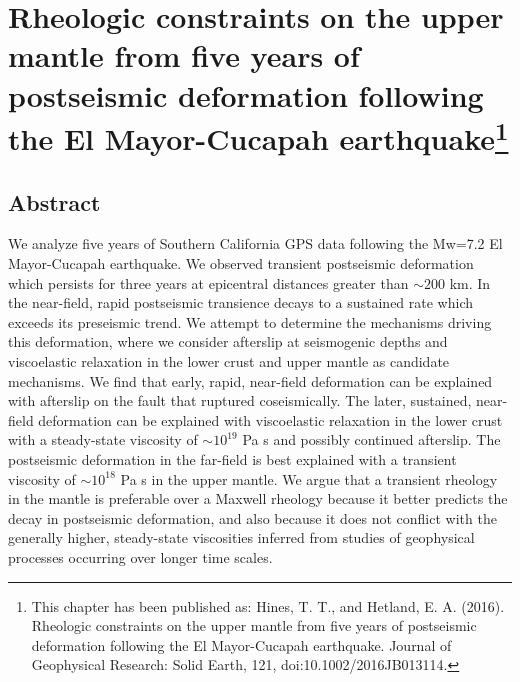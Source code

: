 \chapter
[Rheologic constraints on the upper mantle from five years of
postseismic deformation following the El Mayor-Cucapah earthquake]
{Rheologic constraints on the upper mantle from five years of
postseismic deformation following the El Mayor-Cucapah earthquake\footnote[1]{
This chapter has been published as: Hines, T. T., and Hetland, E. A.
(2016). Rheologic constraints on the upper mantle from five years of
postseismic deformation following the El Mayor-Cucapah earthquake.
Journal of Geophysical Research: Solid Earth, 121,
doi:10.1002/2016JB013114.}}

\section{Abstract}
We analyze five years of Southern California GPS data following the
Mw=7.2 El Mayor-Cucapah earthquake.  We observed transient postseismic
deformation which persists for three years at epicentral distances
greater than ${\sim}200$ km.  In the near-field, rapid postseismic
transience decays to a sustained rate which exceeds its preseismic
trend.  We attempt to determine the mechanisms driving this
deformation, where we consider afterslip at seismogenic depths and
viscoelastic relaxation in the lower crust and upper mantle as
candidate mechanisms.  We find that early, rapid, near-field
deformation can be explained with afterslip on the fault that ruptured
coseismically. The later, sustained, near-field deformation can be
explained with viscoelastic relaxation in the lower crust with a
steady-state viscosity of ${\sim}10^{19}$ Pa s and possibly continued
afterslip.  The postseismic deformation in the far-field is best
explained with a transient viscosity of ${\sim}10^{18}$ Pa s in the
upper mantle. We argue that a transient rheology in the mantle is
preferable over a Maxwell rheology because it better predicts the
decay in postseismic deformation, and also because it does not
conflict with the generally higher, steady-state viscosities inferred
from studies of geophysical processes occurring over longer time
scales.

